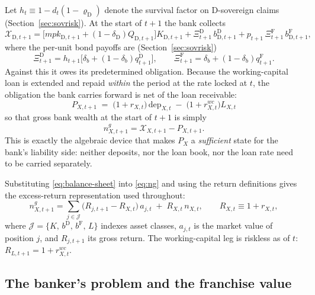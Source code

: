 \documentclass[11pt]{article}
\numberwithin{equation}{section}
\newcommand{\D}{\mathrm{D}}
\newcommand{\F}{\mathrm{F}}
\theoremstyle{definition}
\theoremstyle{plain}
\theoremstyle{remark}
\begin{document}
Let $h_t\equiv1-d_t(1-\varrho_\D)$ denote the survival factor on $\D$-sovereign
claims (Section~\ref{sec:sovrisk}). At the start of $t+1$ the bank collects
\begin{equation}
\mathcal{X}_{\D,t+1}
=\bigl[mpk_{\D,t+1}+(1-\delta_\D)Q_{\D,t+1}\bigr]K_{\D,t+1}
+\Xi^{\D}_{t+1}\,b^{\D}_{\D,t+1}
+p_{t+1}\,\Xi^{\F}_{t+1}\,b^{\F}_{\D,t+1},
\label{eq:asset-payoff}
\end{equation}
where the per-unit bond payoffs are (Section~\ref{sec:sovrisk})
\begin{equation}
\Xi^{\D}_{t+1}=h_{t+1}\bigl[\delta_b+(1-\delta_b)q^{\D}_{t+1}\bigr],
\qquad
\Xi^{\F}_{t+1}=\delta_b+(1-\delta_b)q^{\F}_{t+1}.
\label{eq:bond-payoff}
\end{equation}
Against this it owes its predetermined obligation. Because the working-capital loan
is extended and repaid \emph{within} the period at the rate locked at $t$, the
obligation the bank carries forward is net of the loan receivable:
\begin{equation}
\boxed{\;P_{X,t+1}\;=\;\bigl(1+r_{X,t}\bigr)\,\mathrm{dep}_{X,t}
\;-\;\bigl(1+r^{wc}_{X,t}\bigr)L_{X,t}\;}
\label{eq:P-state}
\end{equation}
so that gross bank wealth at the start of $t+1$ is simply
\begin{equation}
n^{g}_{X,t+1}=\mathcal{X}_{X,t+1}-P_{X,t+1}.
\label{eq:ng}
\end{equation}
This is exactly the algebraic device that makes $P_{X}$ a \emph{sufficient} state for
the bank's liability side: neither deposits, nor the loan book, nor the loan rate
need to be carried separately.

Substituting \eqref{eq:balance-sheet} into \eqref{eq:ng} and using the return
definitions gives the excess-return representation used throughout:
\begin{equation}
n^{g}_{X,t+1}
=\sum_{j\in\mathcal{J}}\bigl(R_{j,t+1}-R_{X,t}\bigr)\,a_{j,t}
\;+\;R_{X,t}\,n_{X,t},
\qquad R_{X,t}\equiv1+r_{X,t},
\label{eq:ng-excess}
\end{equation}
where $\mathcal{J}=\{K,\,b^{\D},\,b^{\F},\,L\}$ indexes asset classes, $a_{j,t}$ is
the market value of position $j$, and $R_{j,t+1}$ its gross return. The
working-capital leg is riskless as of $t$: $R_{L,t+1}=1+r^{wc}_{X,t}$.

\subsection{The banker's problem and the franchise value}
\end{document}
